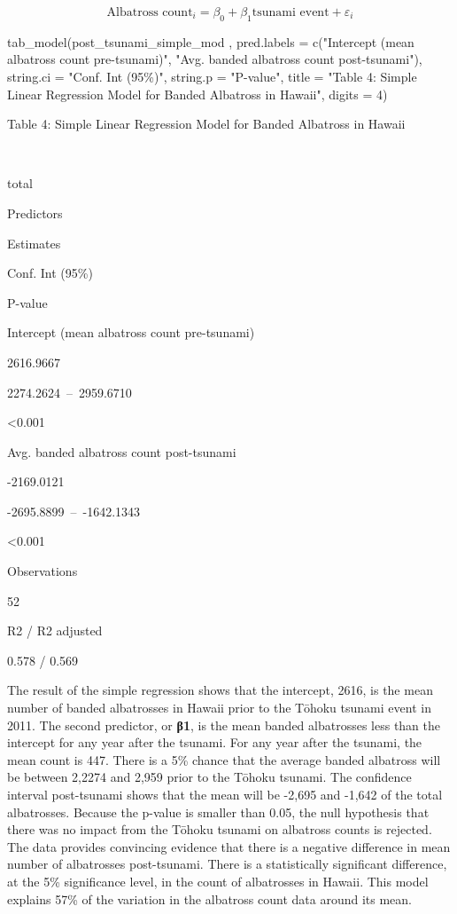 \documentclass[
]{article}
\newenvironment{Shaded}{\begin{snugshade}}{\end{snugshade}}
\newcommand{\AttributeTok}[1]{\textcolor[rgb]{0.77,0.63,0.00}{#1}}
\newcommand{\DecValTok}[1]{\textcolor[rgb]{0.00,0.00,0.81}{#1}}
\newcommand{\FunctionTok}[1]{\textcolor[rgb]{0.00,0.00,0.00}{#1}}
\newcommand{\NormalTok}[1]{#1}
\newcommand{\StringTok}[1]{\textcolor[rgb]{0.31,0.60,0.02}{#1}}
\begin{document}
\[ \text{Albatross count}_i = \beta_0 + \beta_1 \text{tsunami event}  + \varepsilon_i \]

\begin{Shaded}
\begin{Highlighting}[]
\FunctionTok{tab\_model}\NormalTok{(post\_tsunami\_simple\_mod ,}
          \AttributeTok{pred.labels =} \FunctionTok{c}\NormalTok{(}\StringTok{"Intercept (mean albatross count pre{-}tsunami)"}\NormalTok{, }\StringTok{"Avg. banded albatross count post{-}tsunami"}\NormalTok{),}
          \AttributeTok{string.ci =} \StringTok{"Conf. Int (95\%)"}\NormalTok{,}
          \AttributeTok{string.p =} \StringTok{"P{-}value"}\NormalTok{,}
          \AttributeTok{title =} \StringTok{"Table 4: Simple Linear Regression Model for Banded Albatross in Hawaii"}\NormalTok{,}
          \AttributeTok{digits =} \DecValTok{4}\NormalTok{)}
\end{Highlighting}
\end{Shaded}

Table 4: Simple Linear Regression Model for Banded Albatross in Hawaii

~

total

Predictors

Estimates

Conf. Int (95\%)

P-value

Intercept (mean albatross count pre-tsunami)

2616.9667

2274.2624~--~2959.6710

\textless0.001

Avg. banded albatross count post-tsunami

-2169.0121

-2695.8899~--~-1642.1343

\textless0.001

Observations

52

R2 / R2 adjusted

0.578 / 0.569

The result of the simple regression shows that the intercept, 2616, is
the mean number of banded albatrosses in Hawaii prior to the Tōhoku
tsunami event in 2011. The second predictor, or \textbf{β1}, is the mean
banded albatrosses less than the intercept for any year after the
tsunami. For any year after the tsunami, the mean count is 447. There is
a 5\% chance that the average banded albatross will be between 2,2274
and 2,959 prior to the Tōhoku tsunami. The confidence interval
post-tsunami shows that the mean will be -2,695 and -1,642 of the total
albatrosses. Because the p-value is smaller than 0.05, the null
hypothesis that there was no impact from the Tōhoku tsunami on albatross
counts is rejected. The data provides convincing evidence that there is
a negative difference in mean number of albatrosses post-tsunami. There
is a statistically significant difference, at the 5\% significance
level, in the count of albatrosses in Hawaii. This model explains 57\%
of the variation in the albatross count data around its mean.
\end{document}
